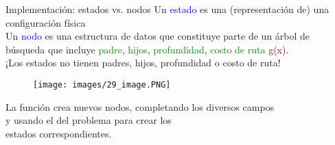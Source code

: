 
\begin{frame}{Implementación: estados vs. nodos}
Un \textcolor{blue}{estado} es una (representación de) una configuración física\\
Un \textcolor{blue}{nodo} es una estructura de datos que constituye parte de un árbol de búsqueda que incluye \textcolor{Green}{padre}, \textcolor{Green}{hijos}, \textcolor{Green}{profundidad}, \textcolor{Green}{costo de ruta} \textcolor{DarkRed}{g(x)}.\\
¡Los estados no tienen padres, hijos, profundidad o costo de ruta!
\begin{figure}
    \centering
    \texttt{[image: images/29\_image.PNG]}
\end{figure}
La función  crea nuevos nodos, completando los diversos campos\\
\hspace{0.8cm}y usando el  del problema para crear los\\
\hspace{0.8cm}estados correspondientes.
\end{frame}
